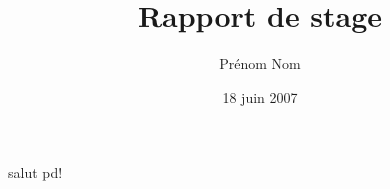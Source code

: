 \documentclass[a4paper, titlepage]{report}
\title{Rapport de stage}      %
\author{Prénom Nom}           %
\date{18 juin 2007}           %
\begin{document}
salut pd!
\end{document}
